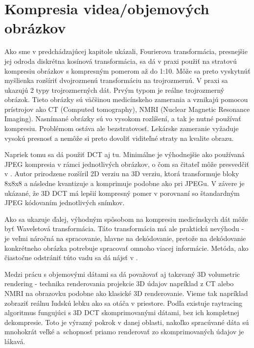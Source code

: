 \section{Kompresia videa/objemových obrázkov}

Ako sme v predchádzajúcej kapitole ukázali, Fourierova transformácia,
presnejšie jej odroda diskrétna kosínová transformácia, sa dá v praxi
použiť na stratovú kompresiu obrázkov s kompresným pomerom až do 1:10.
Môže sa preto vyskytnúť myšlienka rozšíriť dvojrozmenú transformáciu
na trojrozmernú.
V praxi sa ukazujú 2 typy trojrozmerných dát.
Prvým typom je reálne trojrozmerný obrázok. Tieto obrázky sú
väčšinou medicínskeho zamerania a vznikajú pomocou prístrojov ako CT
(Computed tomography), NMRI (Nuclear Magnetic Resonance Imaging).
Nasnímané obrázky sú vo vysokom rozlíšení, a tak je nutné používať kompresiu.
Problémom ostáva ale bezstratovosť. Lekárske zameranie vyžaduje vysokú
presnosť a nemôže si preto dovoliť viditeľné straty na kvalite obrazu.

Napriek tomu sa dá použiť DCT aj tu. Minimálne je výhodnejšie ako
používaná JPEG kompresia v rámci jednotlivých obrázkov, o čom sa
čitateľ môže presvedčiť v \cite{medical_dct}. 
Autor prirodzene rozšíril 2D verziu na 3D verziu, 
ktorá transformuje bloky 8x8x8 a následne kvantizuje a komprimuje
podobne ako pri JPEGu. V závere je ukázané, že 3D DCT má lepšií
kompresný pomer v porovnaní so štandardným JPEG kódovaním jednotlivých
snímkov.

Ako sa ukazuje ďalej, výhodným spôsobom na kompresiu medicínskych dát
môže byť Waveletová transformácia. Táto transformácia má ale praktickú
nevýhodu - je veľmi náročná na spracovanie, hlavne na dekódovanie,
pretože na dekódovanie konkrétneho obrázka potrebuje spracovať omnoho
viacej informácie. Metóda, ako čiastočne odstrániť túto vadu sa dá
nájsť v \cite{wavelet3d}.

Medzi prácu s objemovými dátami sa dá považovať aj takzvaný 3D volumetric
rendering - technika renderovania projekcie 3D údajov napríklad z CT
alebo NMRI na obrazovku podobne ako klasické 3D renderovanie. Vieme
tak napríklad zobraziť reálnu ľudskú lebku ako sa otáča v priestore.
Podľa \cite{volumdct} existuje raytracing algoritmus fungujúci s 3D DCT
skomprimovanými dátami, bez ich kompletnej dekompresie.
Toto je výrazný pokrok v danej oblasti, nakoľko spracúvané dáta sú
mnohokrát veľké a~schopnosť priamo renderovať zo skomprimovaných
údajov je lákavá.

